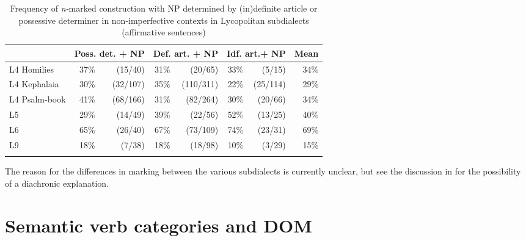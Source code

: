 \documentclass[output=paper]{LSP/langsci}
\begin{document}
\begin{table}
\begin{tabular}{lrrrrrrr}
\lsptoprule
&
\multicolumn{2}{l}{Poss. det. + NP} &
\multicolumn{2}{l}{Def. art. + NP} &
\multicolumn{2}{l}{Idf. art.+ NP} & Mean\\
\midrule
L4 Homilies  & 37\% & (15/40) & 31\%& (20/65)   & 33\%& (5/15) & 34\%\\
L4 Kephalaia & 30\% & (32/107) & 35\%& (110/311) & 22\%& (25/114) & 29\%\\
L4 Psalm-book& 41\% & (68/166) & 31\%& (82/264)  & 30\%& (20/66) & 34\%\\
L5           & 29\%& (14/49) & 39\%& (22/56)     & 52\%& (13/25) & 40\%\\
L6           & 65\%& (26/40) & 67\%& (73/109)    & 74\%& (23/31) & 69\%\\
L9           & 18\%& (7/38) & 18\%& (18/98)       & 10\%& (3/29) & 15\%\\
\lspbottomrule
\end{tabular}
\caption{Frequency of \textit{n-}marked construction with NP determined by (in)definite article or possessive determiner in non-imperfective contexts in Lycopolitan subdialects (affirmative sentences)}\label{06-en-tab:4}
\end{table}


The reason for the differences in marking between the various subdialects is currently unclear, but see the discussion in  for the possibility of a diachronic explanation.

\section{Semantic verb categories and DOM}
\label{06-en-sec:4}
\end{document}
